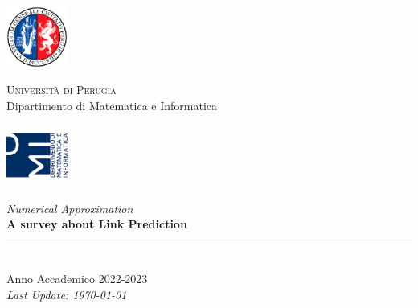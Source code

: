 
\thispagestyle{empty} %

\noindent %
\includegraphics[width=0.15\textwidth]{frontmatter/imgs/logoUniPg.jpg}
\begin{minipage}[b]{0.7\textwidth}
    \centering
    {\Large \textsc{Universit{\`a} di Perugia}}\\
    \vspace{0.4 em}
    {\large Dipartimento di Matematica e Informatica}
    \vspace{0.6 em}
\end{minipage}%
\includegraphics[width=0.15\textwidth]{frontmatter/imgs/logoDMI.jpg}

\vspace{8 em}

\begin{center}
    {\Huge \textit{Numerical Approximation}}\\
    \vspace{5 em}
    {\Huge \textbf{A survey about Link Prediction}}\\

    \vfill

    \rule{380pt}{.4pt}\\
    \vspace{1.2 em}
    \large{Anno Accademico 2022-2023}\\ %
    \vspace{.9 em}
    \small{\textit{Last Update: \today{}}}
\end{center}

